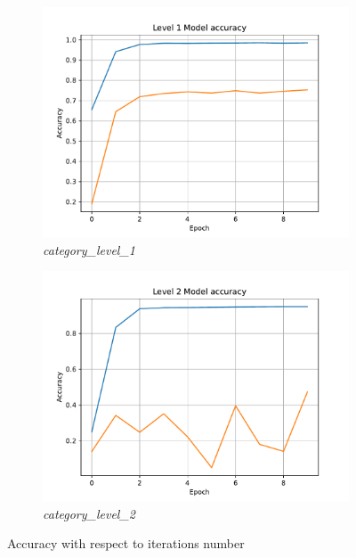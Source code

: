 \begin{figure}[htpb]
	\centering
	\begin{subfigure}{0.48\linewidth}
		\centering
		\includegraphics[width=\linewidth]{Images/level_1_epoch_accuracy.pdf}
		\caption{\textit{category\_level\_1}}
	\end{subfigure}
	\begin{subfigure}{0.48\linewidth}
		\centering
		\includegraphics[width=\linewidth]{Images/level_2_epoch_accuracy.pdf}
		\caption{\textit{category\_level\_2}}
	\end{subfigure}
	\caption{Accuracy with respect to iterations number}
	\label{fig:epocs_vs_accuracy}
\end{figure}
